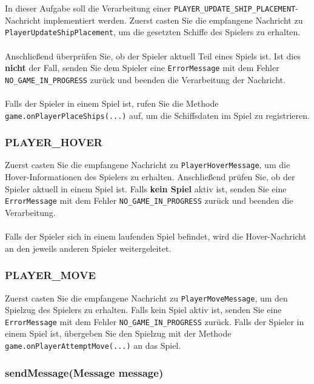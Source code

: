 \documentclass[12pt]{article}
\begin{document}
In dieser Aufgabe soll die Verarbeitung einer \texttt{PLAYER\_UPDATE\_SHIP\_PLACEMENT}-Nachricht implementiert werden. 
Zuerst casten Sie die empfangene Nachricht zu \texttt{PlayerUpdate\hspace{0pt}ShipPlacement}, 
um die gesetzten Schiffe des Spielers zu erhalten.
\\ \\
Anschließend überprüfen Sie, ob der Spieler aktuell Teil eines Spiels ist. 
Ist dies \textbf{nicht} der Fall, senden Sie dem Spieler eine \texttt{ErrorMessage} mit dem Fehler \texttt{NO\_GAME\_IN\_PROGRESS} zurück 
und beenden die Verarbeitung der Nachricht.
\\ \\
Falls der Spieler in einem Spiel ist, rufen Sie die Methode \texttt{game.onPlayerPlaceShips(...)} auf, 
um die Schiffsdaten im Spiel zu registrieren.

\subsubsection*{PLAYER\_HOVER}

Zuerst casten Sie die empfangene Nachricht zu \texttt{PlayerHoverMessage}, um die Hover-Informationen des Spielers zu erhalten. 
Anschließend prüfen Sie, ob der Spieler aktuell in einem Spiel ist. 
Falls \textbf{kein Spiel} aktiv ist, senden Sie eine \texttt{ErrorMessage} mit dem Fehler \texttt{NO\_GAME\_IN\_PROGRESS} zurück 
und beenden die Verarbeitung.
\\ \\
Falls der Spieler sich in einem laufenden Spiel befindet, wird die Hover-Nachricht an den jeweils anderen Spieler weitergeleitet.

\subsubsection*{PLAYER\_MOVE}

Zuerst casten Sie die empfangene Nachricht zu \texttt{PlayerMoveMessage}, um den Spielzug des Spielers zu erhalten.
Falls kein Spiel aktiv ist, senden Sie eine \texttt{ErrorMessage} mit dem Fehler \texttt{NO\_GAME\_IN\_PROGRESS} zurück. 
Falls der Spieler in einem Spiel ist, übergeben Sie den Spielzug mit der Methode \texttt{game.onPlayerAttemptMove(...)} an das Spiel.

\subsubsection*{sendMessage(Message message)}
\end{document}
